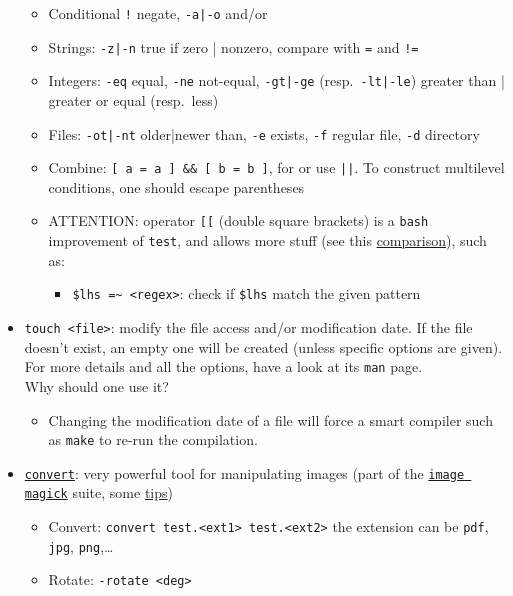 \documentclass[a4paper,12pt,%
              final%
              ]{article}
\begin{document}
\begin{itemize}
    \begin{itemize}
      \item Conditional \verb|!| negate, \verb!-a|-o! and/or
      \item Strings: \verb!-z|-n! true if zero | nonzero, compare with \verb|=| and \verb|!=|
      \item Integers: \verb|-eq| equal, \verb|-ne| not-equal, \verb!-gt|-ge! (resp.~\verb!-lt|-le!) greater than | greater or equal (resp.~less)
      \item Files: \verb!-ot|-nt! older|newer than, \verb|-e| exists, \verb|-f| regular file, \verb|-d| directory
      \item Combine: \verb|[ a = a ] && [ b = b ]|, for or use \verb!||!. To construct multilevel conditions, one should escape parentheses
      \item ATTENTION: operator \verb|[[| (double square brackets) is a \texttt{bash} improvement of \texttt{test}, and allows more stuff (see this \href{https://stackoverflow.com/a/47576482}{comparison}), such as:
        \begin{itemize}
          \item \verb|$lhs =~ <regex>|: check if \verb|$lhs| match the given pattern
        \end{itemize}
    \end{itemize}
  \item \verb|touch <file>|: modify the file access and/or modification date. If the file doesn't exist, an empty one will be created (unless specific options are given). For more details and all the options, have a look at its \texttt{man} page.\\
  Why should one use it?
    \begin{itemize}
      \item Changing the modification date of a file will force a smart compiler such as \verb|make| to re-run the compilation.
    \end{itemize}
  \item \href{http://www.imagemagick.org/script/convert.php}{\texttt{convert}}: very powerful tool for manipulating images (part of the \href{https://imagemagick.org/index.php}{\texttt{image magick}} suite, some \href{http://www.imagemagick.org/script/command-line-processing.php}{tips})
    \begin{itemize}
      \item Convert: \verb|convert test.<ext1> test.<ext2>| the extension can be \texttt{pdf}, \texttt{jpg}, \texttt{png},\ldots
      \item Rotate: \verb|-rotate <deg>|

\end{itemize}
\end{itemize}
\end{document}
